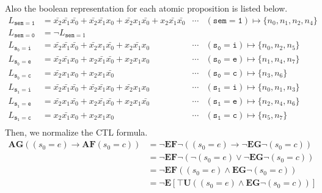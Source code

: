 \documentclass[a4paper,11pt]{article}
\theoremstyle{mytheor}
\begin{document}
Also the boolean representation for each atomic proposition is listed below.
\begin{equation*}
  \begin{array}{llcl}
   L_{\mathtt{sem=1}} &= \bar{x_2}\bar{x_1}\bar{x_0} + \bar{x_2}\bar{x_1}x_0 
                       + \bar{x_2}x_1\bar{x_0} + x_2\bar{x_1}\bar{x_0}       & \cdots & (\mathtt{sem=1}) \mapsto \{n_0,n_1,n_2,n_4\}\\
   L_{\mathtt{sem=0}} &= \neg L_{\mathtt{sem}=1} \\
   L_{\mathtt{s_0=i}} &= \bar{x_2}\bar{x_1}\bar{x_0} + \bar{x_2}x_1\bar{x_0}
                       + x_2\bar{x_1}x_0                                     & \cdots & (\mathtt{s_0=i}) \mapsto \{n_0,n_2,n_5\}\\
   L_{\mathtt{s_0=e}} &= \bar{x_2}\bar{x_1}x_0 + x_2\bar{x_1}\bar{x_0}
                       + x_2x_1x_0                                           & \cdots & (\mathtt{s_0=e}) \mapsto \{n_1,n_4,n_7\}\\
   L_{\mathtt{s_0=c}} &= \bar{x_2}x_1x_0 + x_2x_1\bar{x_0}                   & \cdots & (\mathtt{s_0=c}) \mapsto \{n_3,n_6\}\\
   L_{\mathtt{s_1=i}} &= \bar{x_2}\bar{x_1}\bar{x_0} + \bar{x_2}\bar{x_1}x_0
                       + \bar{x_2}x_1x_0                                     & \cdots & (\mathtt{s_1=i}) \mapsto \{n_0,n_1,n_3\}\\
   L_{\mathtt{s_1=e}} &= \bar{x_2}x_1\bar{x_0} + x_2\bar{x_1}\bar{x_0}
                       + x_2x_1\bar{x_0}                                     & \cdots & (\mathtt{s_1=e}) \mapsto \{n_2,n_4,n_6\}\\
   L_{\mathtt{s_1=c}} &= x_2\bar{x_1}x_0 + x_2x_1x_0                         & \cdots & (\mathtt{s_1=c}) \mapsto \{n_5,n_7\}\\
  \end{array}
\end{equation*}
Then, we normalize the CTL formula.
\begin{equation*}
\begin{array}{ll}
   \textbf{AG}((s_0 = e) \rightarrow \textbf{AF}(s_0 = c))
      &= \neg \textbf{EF} \neg((s_0 = e) \rightarrow \neg \textbf{EG} \neg(s_0 = c)) \\
      &= \neg \textbf{EF} \neg( \neg(s_0 = e) \vee \neg \textbf{EG} \neg(s_0 = c)) \\
      &= \neg \textbf{EF} ((s_0 = e) \wedge \textbf{EG} \neg(s_0 = c)) \\
      &= \neg \textbf{E} [ \top \textbf{U} ((s_0 = e) \wedge \textbf{EG} \neg(s_0 = c))] \\
\end{array}
\end{equation*}
\end{document}
